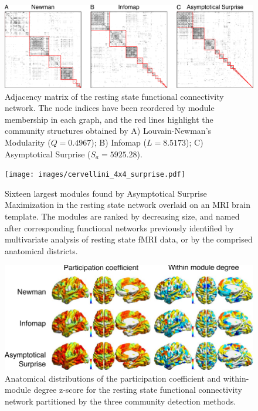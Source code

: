 \begin{figure}[!ht]
\includegraphics[width=1.0\textwidth]{images/comparison_newman_infomap_surprise.pdf}
\caption{Adjacency matrix of the resting state functional connectivity network. The node indices have been reordered by module membership in each graph, and the red lines highlight the community structures obtained by A) Louvain-Newman's Modularity  ($Q=0.4967$); B)  Infomap ($L=8.5173$); C) Asymptotical Surprise ($S_a=5925.28$).}
\label{fig:partitioncomparison}
\end{figure}

\begin{figure}[!ht]
\texttt{[image: images/cervellini\_4x4\_surprise.pdf]}
\caption{Sixteen largest modules found by Asymptotical Surprise Maximization in the resting state network overlaid on an MRI brain template. The modules are ranked by decreasing size, and named after corresponding functional networks previously identified by multivariate analysis of resting state fMRI data, or by the comprised anatomical districts.}
\label{fig:cervellini4x4}
\end{figure}

\begin{figure}[!ht]
\includegraphics[width=1.0\textwidth]{images/participation_coeff_surprise.pdf}
\caption{Anatomical distributions of the participation coefficient and within-module degree z-score for the resting state functional connectivity network partitioned by the three community detection methods.}
\label{fig:hubclassification}
\end{figure}


